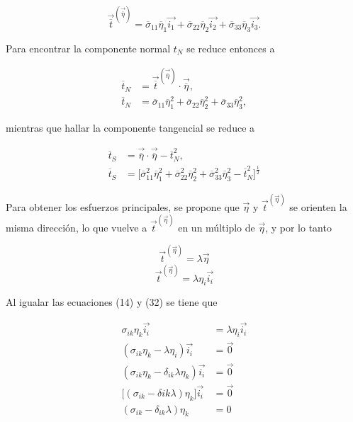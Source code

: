 \documentclass{article}
\begin{document}
    \begin{equation}
        \vec{\overline{t}}^{(\vec{\overline{\eta}})} =
        \overline{\sigma}_{11}\overline{\eta}_{1}\vec{i_{1}} +
        \overline{\sigma}_{22}\overline{\eta}_{2}\vec{i_{2}} +
        \overline{\sigma}_{33}\overline{\eta}_{3}\vec{i_{3}}.
    \end{equation}

    Para encontrar la componente normal $t_{N}$ se reduce entonces a

    \begin{align}
        \overline{t}_{N} &= \vec{\overline{t}}^{(\vec{\overline{\eta}})} \cdot \vec{\overline{\eta}},\\
        \overline{t}_{N} &= \overline{\sigma}_{11}\overline{\eta}_{1}^2 +
                            \overline{\sigma}_{22}\overline{\eta}_{2}^2 +
                            \overline{\sigma}_{33}\overline{\eta}_{3}^2,
    \end{align}

    mientras que hallar la componente tangencial se reduce a

    \begin{align}
        \overline{t}_{S} &= \vec{\overline{\eta}} \cdot \vec{\overline{\eta}} - \overline{t}_{N}^2, \\
        \overline{t}_{S} &= \lbrack
        \overline{\sigma}_{11}^2\overline{\eta}_{1}^2 +
        \overline{\sigma}_{22}^2\overline{\eta}_{2}^2 +
        \overline{\sigma}_{33}^2\overline{\eta}_{3}^2 -
        \overline{t}_{N}^2
        \rbrack^\frac{1}{2}
    \end{align}

    Para obtener los esfuerzos principales, se propone que $\vec{\eta}$ y $\vec{t}^{(\vec{\eta})}$ se orienten
    la misma direcci\'{o}n, lo que vuelve a $\vec{t}^{(\vec{\eta})}$ en un m\'{u}ltiplo de $\vec{\eta}$, y por
    lo tanto

    \begin{equation}
        \vec{t}^{(\vec{\eta})} = \lambda\vec{\eta}
    \end{equation}
    \begin{equation}
        \vec{t}^{(\vec{\eta})} = \lambda\eta_{i}\vec{i_{i}}
    \end{equation}

    Al igualar las ecuaciones (14) y (32) se tiene que

    \begin{align}
        \sigma_{ik}\eta_{k}\vec{i_{i}} &= \lambda\eta_{i}\vec{i_{i}}\\
        (\sigma_{ik}\eta_{k} - \lambda\eta_{i})\vec{i_{i}} &= \vec{0}\\
        (\sigma_{ik}\eta_{k} - \delta_{ik}\lambda\eta_{k})\vec{i_{i}} &= \vec{0}\\
        \lbrack ( \sigma_{ik} - \delta{ik}\lambda )\eta_{k} \rbrack\vec{i_{i}} &= \vec{0}\\
        (\sigma_{ik} - \delta_{ik}\lambda)\eta_{k} &= 0
    \end{align}
\end{document}
